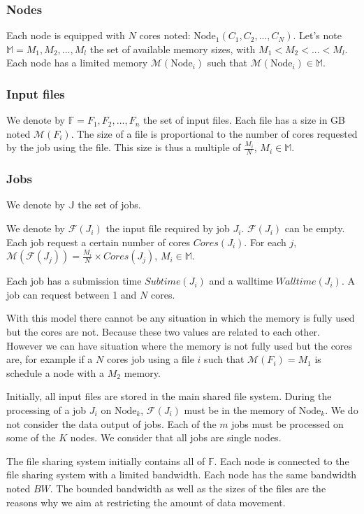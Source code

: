 \documentclass[a4paper]{article}
\newcommand{\Node}[1]{\ensuremath{\mathrm{Node}_{#1}}\xspace}
\newcommand{\inputs}{\ensuremath{\mathcal{F}}\xspace}
\newcommand{\memory}{\ensuremath{\mathcal{M}}\xspace}
\newcommand{\bandwidth}{\mathit{BW}\xspace}
\newcommand{\core}{\mathit{Cores}\xspace}
\newcommand{\submissiontime}{\mathit{Subtime}\xspace}
\newcommand{\walltime}{\mathit{Walltime}\xspace}
\newcommand{\fileset}{\ensuremath{\mathbb{F}}\xspace}
\newcommand{\jobset}{\ensuremath{\mathbb{J}}\xspace}
\begin{document}
\subsubsection{Nodes}
Each node is equipped with $N$ cores noted: $\Node{1}(C_1, C_2, ..., C_{N})$.
Let's note $\mathbb{M} = M_1, M_2, ..., M_l$ the set of available memory sizes, with $M_1 < M_2 < ... < M_l$.
Each node has a limited memory $\memory(\Node{i})$ such that $\memory(\Node{i}) \in \mathbb{M}$.

\subsubsection{Input files}
We denote by $\fileset = F_1, F_2, ..., F_n$ the set of input files.
Each file has a size in GB noted $\memory(F_i)$. 
The size of a file is proportional to the number of cores requested by the job using the file.
This size is thus a multiple of $\frac{M_i}{N}$, $M_i \in \mathbb{M}$.

\subsubsection{Jobs}
We denote by $\jobset$ the set of jobs.

We denote by $\inputs(J_i)$ the input file required by job $J_i$. $\inputs(J_i)$ can be empty.
Each job request a certain number of cores $\core(J_i)$. 
For each $j$, $\memory(\inputs(J_j)) = \frac{M_i}{N} \times \core(J_j)$, $M_i \in \mathbb{M}$.

Each job has a submission time $\submissiontime(J_i)$ and a walltime $\walltime(J_i)$.
A job can request between 1 and $N$ cores.

With this model there cannot be any situation in which the memory is fully used
but the cores are not. Because these two values are related to each other. 
However we can have situation where the memory is not fully used but the cores are,
for example if a $N$ cores job using a file $i$ such that $\memory(F_i) = M_1$ is schedule a node with a $M_2$ memory.

Initially, all input files are stored in the main shared file system.
During the processing of a job $J_i$ on $\Node{k}$,
$\inputs(J_i)$ must be in the memory of $\Node{k}$. 
We do not consider the data output of jobs.
Each of the $m$ jobs must be processed on some of the $K$ nodes. 
We consider that all jobs are single nodes.

The file sharing system initially contains all of $\fileset$.
Each node is connected to the file sharing system with a limited bandwidth.
Each node has the same bandwidth noted $\bandwidth$.
The bounded bandwidth as well as the sizes of the files are the reasons why
we aim at restricting the amount of data movement.
\end{document}

